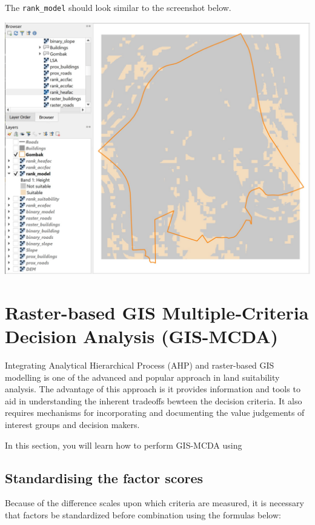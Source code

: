 \documentclass[
  letterpaper,
  DIV=11,
  numbers=noendperiod]{scrreprt}
\begin{document}
The \texttt{rank\_model} should look similar to the screenshot below.

\includegraphics{./img08/image12.jpg}

\hypertarget{raster-based-gis-multiplecriteria-decision-analysis-gis-mcda}{%
\section{Raster-based GIS Multiple‐Criteria Decision Analysis
(GIS-MCDA)}\label{raster-based-gis-multiplecriteria-decision-analysis-gis-mcda}}

Integrating Analytical Hierarchical Process (AHP) and raster-based GIS
modelling is one of the advanced and popular approach in land
suitability analysis. The advantage of this approach is it provides
information and tools to aid in understanding the inherent tradeoffs
bewteen the decision criteria. It also requires mechanisms for
incorporating and documenting the value judgements of interest groups
and decision makers.

In this section, you will learn how to perform GIS-MCDA using

\hypertarget{standardising-the-factor-scores}{%
\subsection{Standardising the factor
scores}\label{standardising-the-factor-scores}}

Because of the difference scales upon which criteria are measured, it is
necessary that factors be standardized before combination using the
formulas below:
\end{document}
